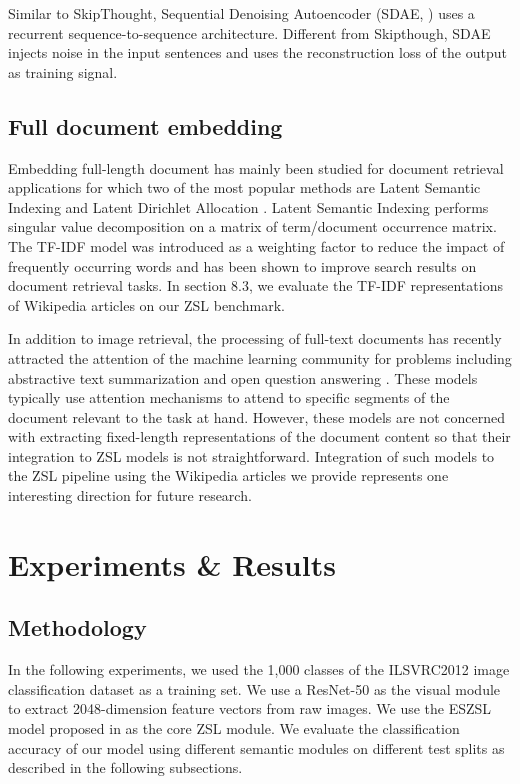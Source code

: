 Similar to SkipThought, Sequential Denoising Autoencoder (SDAE, \cite{hill2016learning}) uses a recurrent sequence-to-sequence architecture. Different from Skipthough, SDAE injects noise in the input sentences and uses the reconstruction loss of the output as training signal.

\subsection{Full document embedding}
Embedding full-length document has mainly been studied for document retrieval applications for which two of the most popular methods are Latent Semantic Indexing \cite{dumais2004latent} and Latent Dirichlet Allocation \cite{blei2003latent}. Latent Semantic Indexing performs singular value decomposition on a matrix of term/document occurrence matrix. The TF-IDF model was introduced as a weighting factor to reduce the impact of frequently occurring words and has been shown to improve search results on document retrieval tasks. In section 8.3, we evaluate the TF-IDF representations of Wikipedia articles on our ZSL benchmark.

In addition to image retrieval, the processing of full-text documents has recently attracted the attention of the machine learning community for problems including abstractive text summarization \cite{nallapati2016abstractive} and open question answering \cite{chen2017reading}. These models typically use attention mechanisms to attend to specific segments of the document relevant to the task at hand. However, these models are not concerned with extracting fixed-length representations of the document content so that their integration to ZSL models is not straightforward. Integration of such models to the ZSL pipeline using the Wikipedia articles we provide represents one interesting direction for future research.

\section{Experiments \& Results}
\subsection{Methodology}
In the following experiments, we used the 1,000 classes of the ILSVRC2012 image classification dataset as a training set. We use a ResNet-50 \cite{he2016deep} as the visual module to extract 2048-dimension feature vectors from raw images. We use the ESZSL model proposed in \cite{romera2015embarrassingly} as the core ZSL module. We evaluate the classification accuracy of our model using different semantic modules on different test splits as described in the following subsections. 

